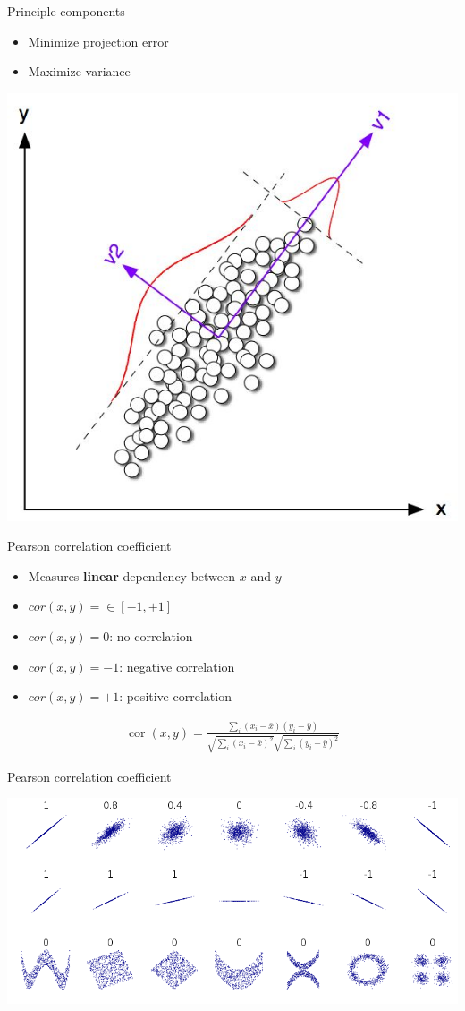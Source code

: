 \documentclass{beamer}\usepackage[]{graphicx}\usepackage[]{color}
\begin{document}
\begin{frame}{Principle components}
  \begin{itemize}
    \item Minimize projection error
    \item Maximize variance
  \end{itemize}
  \begin{center}
    \includegraphics[width=.6\linewidth]{pca.jpg}
  \end{center}
\end{frame}

\begin{frame}{Pearson correlation coefficient}
  \begin{itemize}
    \item Measures \textbf{linear} dependency between $x$ and $y$
    \item $cor(x,y) = \in \left[-1,+1\right]$
    \item $cor(x,y) = 0$: no correlation
    \item $cor(x,y) = -1$: negative correlation
    \item $cor(x,y) = +1$: positive correlation
  \end{itemize}
  \begin{definition}
    \begin{align*}
      \operatorname{cor}(x, y) = \frac{\sum_i (x_i - \bar{x})(y_i - \bar{y})}
      {\sqrt{\sum_i (x_i - \bar{x})^2}\sqrt{\sum_i (y_i - \bar{y})^2}}
    \end{align*}
  \end{definition}
\end{frame}

\begin{frame}{Pearson correlation coefficient}
  \begin{center}
    \includegraphics[width=0.8\linewidth]{pearson.png}
  \end{center}
\end{frame}
\end{document}
